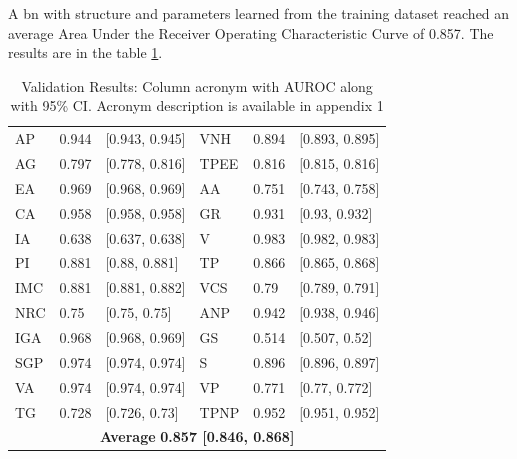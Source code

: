 
A \ac{bn} with structure and parameters learned from the training dataset reached an average Area Under the Receiver Operating Characteristic Curve of 0.857. The results are in the table \ref{tab:result_auc}.



\begin{table}[htpb]
 \caption{Validation Results: Column acronym with AUROC along with 95\% CI. Acronym description is available in appendix 1} \label{tab:result_auc} 

\renewcommand{\arraystretch}{1.2}
\centering
\begin{tabular} { p{1.5cm} p{1.5cm} p{3cm} p{1.5cm} p{1.5cm} l }
\hline
AP & 0.944 & [0.943, 0.945] & VNH & 0.894 & [0.893, 0.895] \\
AG & 0.797 & [0.778, 0.816] & TPEE & 0.816 & [0.815, 0.816] \\
EA & 0.969 & [0.968, 0.969] & AA & 0.751 & [0.743, 0.758] \\
CA & 0.958 & [0.958, 0.958] & GR & 0.931 & [0.93, 0.932] \\
IA & 0.638 & [0.637, 0.638] & V & 0.983 & [0.982, 0.983] \\
PI & 0.881 & [0.88, 0.881] & TP & 0.866 & [0.865, 0.868] \\
IMC & 0.881 & [0.881, 0.882] & VCS & 0.79 & [0.789, 0.791] \\
NRC & 0.75 & [0.75, 0.75] & ANP & 0.942 & [0.938, 0.946] \\
IGA & 0.968 & [0.968, 0.969] & GS & 0.514 & [0.507, 0.52] \\
SGP & 0.974 & [0.974, 0.974] & S & 0.896 & [0.896, 0.897] \\
VA & 0.974 & [0.974, 0.974] & VP & 0.771 & [0.77, 0.772] \\
TG & 0.728 & [0.726, 0.73] & TPNP & 0.952 & [0.951, 0.952] \\
\hline
 \multicolumn{6}{c}{\textbf{Average}  \textbf{0.857 [0.846, 0.868]}} \\

\hline
\end{tabular}
\end{table}


